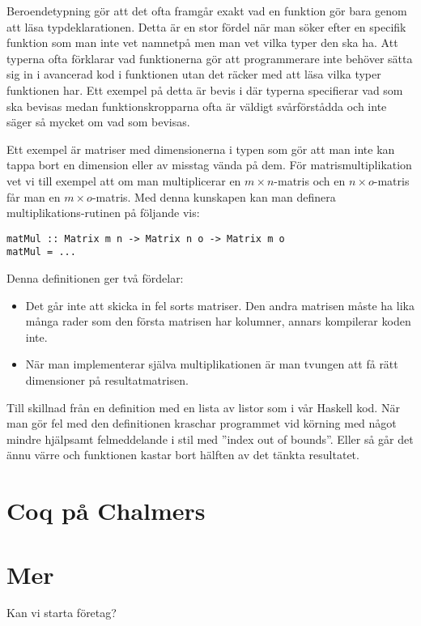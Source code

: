 Beroendetypning gör att det ofta framgår exakt vad en funktion gör bara genom
att läsa typdeklarationen. Detta är en stor fördel när man söker efter en
specifik funktion som man inte vet namnetpå men man vet vilka typer den ska ha.
Att typerna ofta förklarar vad funktionerna gör att programmerare inte behöver
sätta sig in i avancerad kod i funktionen utan det räcker med att läsa vilka
typer funktionen har. Ett exempel på detta är bevis i \coq där typerna
specifierar vad som ska bevisas medan funktionskropparna ofta är väldigt
svårförstådda och inte säger så mycket om vad som bevisas.

Ett exempel är matriser med dimensionerna i typen som gör att man inte kan
tappa bort en dimension eller av misstag vända på dem. För matrismultiplikation
vet vi till exempel att om man multiplicerar en $m \times n$-matris och en
$n \times o$-matris får man en $m \times o$-matris. Med denna kunskapen kan
man definera multiplikations-rutinen på följande vis:

\begin{verbatim}
matMul :: Matrix m n -> Matrix n o -> Matrix m o
matMul = ...
\end{verbatim}

Denna definitionen ger två fördelar:

\begin{itemize}
  \item Det går inte att skicka in fel sorts matriser. Den andra matrisen måste
    ha lika många rader som den första matrisen har kolumner, annars kompilerar
    koden inte.
  \item När man implementerar själva multiplikationen är man tvungen att få rätt
    dimensioner på resultatmatrisen.
\end{itemize}

Till skillnad från en definition med en lista av listor som i vår Haskell kod.
När man gör fel med den definitionen kraschar programmet vid körning med något
mindre hjälpsamt felmeddelande i stil med ''index out of bounds''. Eller så går
det ännu värre och funktionen kastar bort hälften av det tänkta resultatet.

\section{Coq på Chalmers}

\section{Mer}
Kan vi starta företag?
